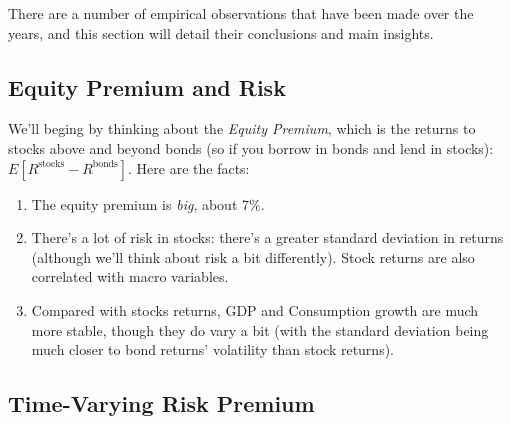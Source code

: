 \documentclass[a4paper,12pt]{scrartcl}
\begin{document}
There are a number of empirical observations that have been made
over the years, and this section will detail their conclusions
and main insights.

\subsection{Equity Premium and Risk}

We'll beging by thinking about the \emph{Equity Premium}, which 
is the returns to stocks above and beyond bonds (so if you borrow
in bonds and lend in stocks): $E[R^{\text{stocks}}-R^{\text{bonds}}]$.
Here are the facts:
\begin{enumerate}
    \item The equity premium is \emph{big}, about 7\%.
    \item There's a lot of risk in stocks: there's a greater 
	standard deviation in returns (although we'll think about
	risk a bit differently). Stock returns are also correlated
	with macro variables.
    \item Compared with stocks returns, GDP and Consumption growth are much
	more stable, though they do vary a bit (with the standard deviation
	being much closer to bond returns' volatility than stock returns).
\end{enumerate}

\subsection{Time-Varying Risk Premium}
\end{document}
